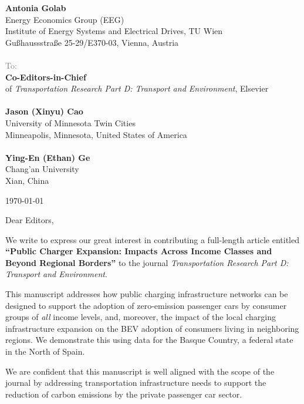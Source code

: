 \documentclass[10.5pt]{letter}
\begin{document}
\begin{letter}{}

\textbf{Antonia Golab} \\
\footnotesize{
Energy Economics Group (EEG) \\
Institute of Energy Systems and Electrical Drives, TU Wien\\
Gußhaussstraße 25-29/E370-03, Vienna, Austria} \\
\\
\normalsize
\textcolor{gray}{To:}\\ 
\textbf{Co-Editors-in-Chief}\\
of \textit{Transportation Research Part D: Transport and Environment}, Elsevier \\\\ 
\textbf{Jason (Xinyu) Cao} \\
\footnotesize{University of Minnesota Twin Cities \\
Minneapolis, Minnesota, United States of America}\\\\
\normalsize\textbf{Ying-En (Ethan) Ge}\\
\footnotesize{Chang'an University\\ 
Xian, China}\\ 
\normalsize

\begin{flushright}
\today
\end{flushright}

Dear Editors,

We write to express our great interest in contributing a full-length article entitled \textbf{``Public Charger Expansion: Impacts Across Income Classes and Beyond Regional Borders''} to the journal \textit{Transportation Research Part D: Transport and Environment}.

This manuscript addresses how public charging infrastructure networks can be designed to support the adoption of zero-emission passenger cars by consumer groups of \textit{all} income levels, and, moreover, the impact of the local charging infrastructure expansion on the BEV adoption of consumers living in neighboring regions. We demonstrate this using data for the Basque Country, a federal state in the North of Spain.

We are confident that this manuscript is well aligned with the scope of the journal by addressing transportation infrastructure needs to support the reduction of carbon emissions by the private passenger car sector. 


\end{letter}
\end{document}
